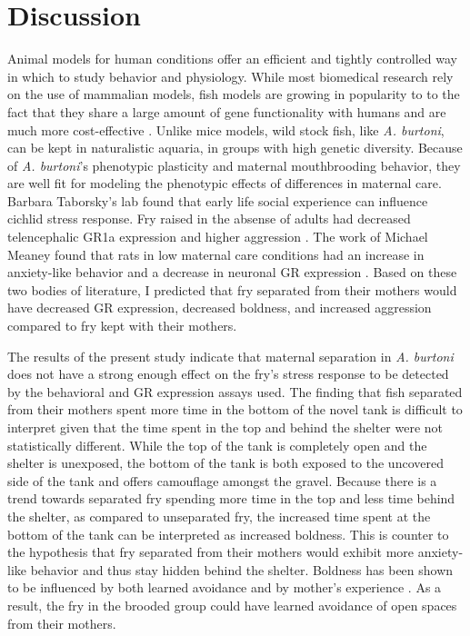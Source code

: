 \documentclass[12pt,twoside]{reedthesis}
\begin{document}
\chapter{Discussion}

Animal models for human conditions offer an efficient and tightly controlled way
in which to study behavior and physiology. While most biomedical research
rely on the use of mammalian models, fish models are growing in popularity to to
the fact that they share a large amount of gene
functionality with humans and are much more cost-effective
\citep{cech_cellular_2011}. Unlike mice models, wild stock fish, like
\textit{A. burtoni}, can be kept in naturalistic aquaria, in groups with high
genetic diversity.
Because of \textit{A. burtoni}'s phenotypic plasticity and maternal
mouthbrooding behavior, they are well fit for modeling the phenotypic effects of
differences in maternal care. Barbara Taborsky's lab found that early life
social experience can influence cichlid stress response. Fry raised in the
absense of adults had decreased telencephalic GR1a expression and higher
aggression \citep{nyman_effect_2017, arnold_social_2010}. The work of Michael Meaney found that rats in low
maternal care conditions had an increase in anxiety-like behavior and a decrease
in neuronal GR expression \citep{caldji_maternal_1998}. Based on these two bodies of literature, I predicted
that fry separated from their mothers would have decreased GR expression,
decreased boldness, and increased aggression compared to fry kept with their mothers. 

The results of the present study indicate that maternal separation in \textit{A.
burtoni} does not have a strong enough effect on the fry's stress response to be
detected by the behavioral and GR expression assays used. The finding that fish separated from their mothers spent more time in the bottom of the novel
tank is difficult to interpret given that the time spent in the top and behind
the shelter were
not statistically different. While the top of the tank is completely open and
the shelter is unexposed, the bottom of the tank is both exposed to the
uncovered side of the tank and offers camouflage amongst the gravel. Because there is a trend towards separated fry spending more time in the top
and less time behind the shelter, as compared to unseparated fry, the increased
time spent at the bottom of the tank can be interpreted as increased 
boldness. This is counter to the hypothesis that
fry separated from their mothers would exhibit more anxiety-like behavior and
thus stay hidden behind the shelter. Boldness has been shown to be influenced by
both learned avoidance and by mother's experience \citep{brown_heritable_2007}. As a result, the fry in
the brooded group could have learned avoidance of open spaces from their mothers. 
\end{document}
